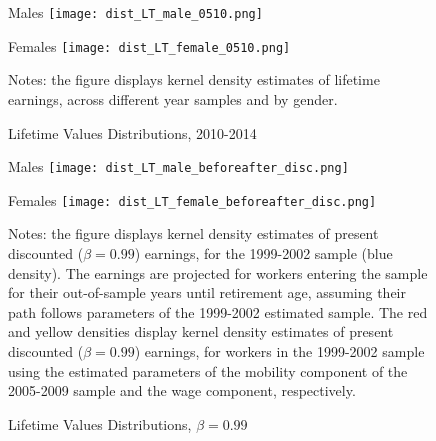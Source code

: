\documentclass[12pt, a4paper]{article}
\begin{document}
\begin{figure}[!htbp]
	\centering
	\begin{minipage}[b]{0.48\textwidth}{Males}
		\centering
		\texttt{[image: dist\_LT\_male\_0510.png]}
	\end{minipage}
	\begin{minipage}[b]{0.48\textwidth}{Females}
		\centering
		\texttt{[image: dist\_LT\_female\_0510.png]}
	\end{minipage}
	\footnotesize{
		\justifying Notes: the figure displays kernel density estimates of lifetime earnings, across different year samples and by gender.\par}
	\captionsetup{font=small,justification=raggedright}
	\caption{Lifetime Values Distributions, 2010-2014}\label{fig:estimation_LT_0510}
\end{figure}

\begin{figure}[!htbp]
	\centering
	\begin{minipage}[b]{0.48\textwidth}{Males}
		\centering
		\texttt{[image: dist\_LT\_male\_beforeafter\_disc.png]}
	\end{minipage}
	\begin{minipage}[b]{0.48\textwidth}{Females}
		\centering
		\texttt{[image: dist\_LT\_female\_beforeafter\_disc.png]}
	\end{minipage}
	\footnotesize{
		\justifying Notes: the figure displays kernel density estimates of present discounted ($\beta=0.99$) earnings, for the 1999-2002 sample (blue density). The earnings are projected for workers entering the sample for their out-of-sample years until retirement age, assuming their path follows parameters of the 1999-2002 estimated sample. The red and yellow densities display kernel density estimates of present discounted ($\beta=0.99$) earnings, for workers in the 1999-2002 sample using the estimated parameters of the mobility component of the 2005-2009 sample and the wage component, respectively.\par}
	\captionsetup{font=small,justification=raggedright}
	\caption{Lifetime Values Distributions, $\beta=0.99$}\label{fig:estimation_LT_disc}
\end{figure}
\end{document}
